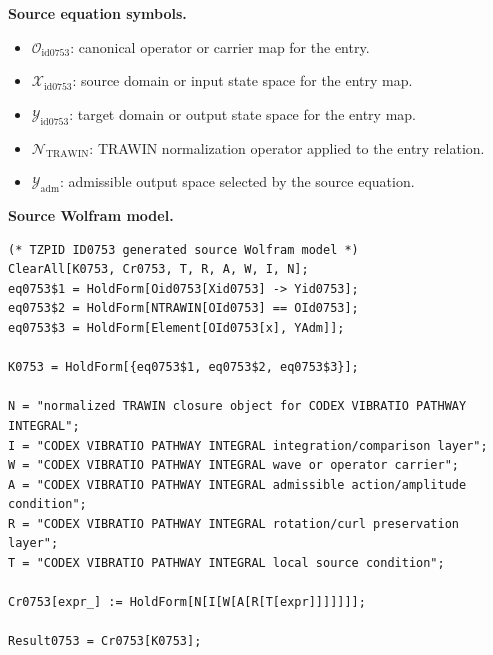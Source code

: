 \begin{minipage}[t]{0.49\linewidth}
\begingroup
\small
\raggedright
\textbf{Source equation symbols.}\par
\begin{itemize}[leftmargin=1.35em,itemsep=1pt,topsep=1pt,parsep=0pt]
    \item $\mathcal{O}_{\mathrm{id0753}}$: canonical operator or carrier map for the entry.
    \item $\mathcal{X}_{\mathrm{id0753}}$: source domain or input state space for the entry map.
    \item $\mathcal{Y}_{\mathrm{id0753}}$: target domain or output state space for the entry map.
    \item $\mathcal{N}_{\mathrm{TRAWIN}}$: TRAWIN normalization operator applied to the entry relation.
    \item $\mathcal{Y}_{\mathrm{adm}}$: admissible output space selected by the source equation.
\end{itemize}
\endgroup
\end{minipage}\hfill
\begin{minipage}[t]{0.47\linewidth}
\begingroup
\scriptsize
\raggedright
\textbf{Source Wolfram model.}\par
\begin{Verbatim}[fontsize=\tiny,breaklines=true,breakanywhere=true]
(* TZPID ID0753 generated source Wolfram model *)
ClearAll[K0753, Cr0753, T, R, A, W, I, N];
eq0753$1 = HoldForm[Oid0753[Xid0753] -> Yid0753];
eq0753$2 = HoldForm[NTRAWIN[OId0753] == OId0753];
eq0753$3 = HoldForm[Element[OId0753[x], YAdm]];

K0753 = HoldForm[{eq0753$1, eq0753$2, eq0753$3}];

N = "normalized TRAWIN closure object for CODEX VIBRATIO PATHWAY INTEGRAL";
I = "CODEX VIBRATIO PATHWAY INTEGRAL integration/comparison layer";
W = "CODEX VIBRATIO PATHWAY INTEGRAL wave or operator carrier";
A = "CODEX VIBRATIO PATHWAY INTEGRAL admissible action/amplitude condition";
R = "CODEX VIBRATIO PATHWAY INTEGRAL rotation/curl preservation layer";
T = "CODEX VIBRATIO PATHWAY INTEGRAL local source condition";

Cr0753[expr_] := HoldForm[N[I[W[A[R[T[expr]]]]]]];

Result0753 = Cr0753[K0753];
\end{Verbatim}
\endgroup
\end{minipage}

